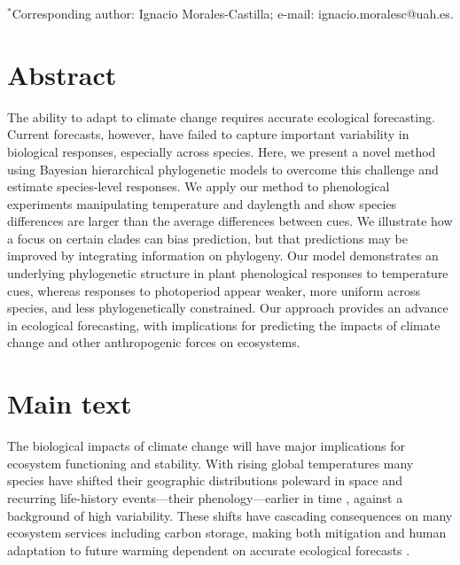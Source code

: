 \documentclass[11pt]{article}
\begin{document}
\vspace{2ex}
$^*$Corresponding author: Ignacio Morales-Castilla; e-mail: ignacio.moralesc@uah.es.\\


\renewcommand{\thetable}{\arabic{table}}
\renewcommand{\thefigure}{\arabic{figure}}
\renewcommand{\labelitemi}{$-$}




\linenumbers
\section*{Abstract} %
The ability to adapt to climate change requires accurate ecological forecasting. Current forecasts, however, have failed to capture important variability in biological responses, especially across species. Here, we present a novel method using Bayesian hierarchical phylogenetic models to overcome this challenge and estimate species-level responses. We apply our method to phenological experiments manipulating temperature and daylength and show species differences are larger than the average differences between cues. We illustrate how a focus on certain clades can bias prediction, but that predictions may be improved by integrating information on phylogeny. Our model demonstrates an underlying phylogenetic structure in plant phenological responses to temperature cues, whereas responses to photoperiod appear weaker, more uniform across species, and less phylogenetically constrained. Our approach provides an advance in ecological forecasting, with implications for predicting the impacts of climate change and other anthropogenic forces on ecosystems.

\clearpage






\section*{Main text}
\par The biological impacts of climate change will have major implications for ecosystem functioning and stability. With rising global temperatures many species have shifted their geographic distributions poleward in space and recurring life-history events---their phenology---earlier in time \citep{IPCC:2014sm,parmesan2003}, against a background of high variability. These shifts have cascading consequences on many ecosystem services including carbon storage, making both mitigation and human adaptation to future warming dependent on accurate ecological forecasts \citep{richardson2013}. 
\end{document}
